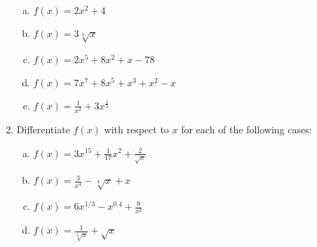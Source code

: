\documentclass[a4paper,12pt]{article}
\begin{document}
\begin{enumerate}
\begin{multicols}{2}
\begin{enumerate}[(a)]
						\item		 $ \displaystyle{ f(x) = 2x^2 + 4\,}$ %
						\item		 $ \displaystyle{ f(x) = 3\sqrt[3]{x}\, }$
						\item		 $ \displaystyle{ f(x) = 2x^5+8x^2+x-78\,}$ %
						\item		 $ \displaystyle{ f(x) = 7x^7+8x^5+x^3+x^2-x\,}$ %
						\item		$ \displaystyle{ f(x) = \frac{1}{x^2}+3x^\frac{1}{3}\,}$ %
					\end{enumerate}
				\end{multicols}
\item Differentiate $f(x)$ with respect to $x$ for each of the following cases:
				\begin{multicols}{2}
					\begin{enumerate}[(a)]				
						\item		 $ \displaystyle{ f(x) = 3x^{15} + \frac{1}{17}x^2 +\frac{2}{\sqrt{x}} \,}$ %
						\item		 $ \displaystyle{ f(x) = \frac{3}{x^4} - \sqrt[4]{x} + x \,}$ %
						\item		 $ \displaystyle{ f(x) = 6x^{1/3}-x^{0.4} +\frac{9}{x^2} \,}$ %
						\item		 $ \displaystyle{ f(x) = \frac{1}{\sqrt[3]{x}} + \sqrt{x} \,}$ %
					\end{enumerate}
				\end{multicols}
				
\end{enumerate}				
\end{document}
